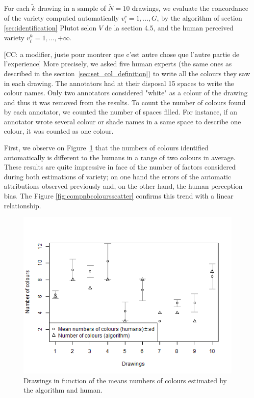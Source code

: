 \documentclass[11pt,a4paper]{article}
\begin{document}
For each $\tilde{k}$ drawing in a sample of $\tilde{N} = 10$ drawings, we evaluate the concordance of the variety computed automatically $v^c_i = {1, \dots, G}$, by the algorithm of section \ref{sec:identification} {\color{red} Plutot selon $V$ de la section 4.5}, and the human perceived variety $v^h_i = {1, \dots, +\infty}$. 

{\color{red}[CC: a modifier, juste pour montrer que c'est autre chose que l'autre partie de l'experience]}
More precisely, we asked five human experts (the same ones as described in the section~\ref{sec:set_col_definition}) to write all the colours they saw in each drawing.
The annotators had at their disposal 15 spaces to write the colour names.
Only two annotators considered "white" as a colour of the drawing and thus it was removed from the results.
To count the number of colours found by each annotator, we counted the number of spaces filled. 
For instance, if an annotator wrote several colour or shade names in a same space to describe one colour, it was counted as one colour.


First, we observe on Figure~\ref{fig:compnbcolourssd} that the numbers of colours identified automatically is different to the humans in a range of two colours in average. 
These results are quite impressive in face of the number of factors considered during both estimations of variety; on one hand the errors of the automatic attributions observed previously and, on the other hand, the human perception bias. 
The Figure \ref{fig:compnbcoloursscatter} confirms this trend with a linear relationship.

\begin{figure}[h!]
	\centering
	\includegraphics[width=\linewidth]{figures/comp_nb_colours_sd.png}
	\caption{Drawings in function of the means numbers of colours estimated by the algorithm and human.}
	\label{fig:compnbcolourssd}
\end{figure}
\end{document}
